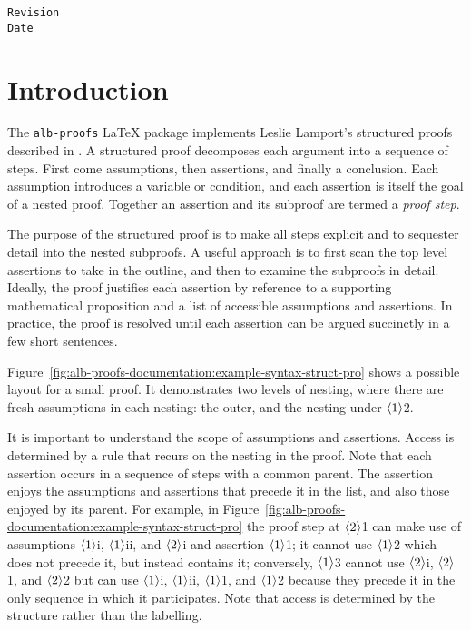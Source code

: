 \documentclass[11pt,a4paper,oneside,titlepage]{alb-corp}
\begin{document}
\begin{albTitlePage}

  \verb$Revision$\\
  \verb$Date$

\end{albTitlePage}




\section{Introduction}
\label{sec:alb-proofs-examples:intr}

The \texttt{alb-proofs} \LaTeX{} package implements Leslie Lamport's
structured proofs described in \citep{lamport93:_how_write_proof}.  A
structured proof decomposes each argument into a sequence of steps.
First come assumptions, then assertions, and finally a conclusion.  Each
assumption introduces a variable or condition, and each assertion is
itself the goal of a nested proof.  Together an assertion and its
subproof are termed a \emph{proof step}.

The purpose of the structured proof is to make all steps explicit and to
sequester detail into the nested subproofs.  A useful approach is to
first scan the top level assertions to take in the outline, and then to
examine the subproofs in detail.  Ideally, the proof justifies each
assertion by reference to a supporting mathematical proposition and a
list of accessible assumptions and assertions.  In practice, the proof
is resolved until each assertion can be argued succinctly in a few short
sentences.

Figure~\ref{fig:alb-proofs-documentation:example-syntax-struct-pro}
shows a possible layout for a small proof.  It demonstrates two levels
of nesting, where there are fresh assumptions in each nesting: the
outer, and the nesting under $\albTuple{1}$2.

It is important to understand the scope of assumptions and assertions.
Access is determined by a rule that recurs on the nesting in the proof.
Note that each assertion occurs in a sequence of steps with a common
parent.  The assertion enjoys the assumptions and assertions that
precede it in the list, and also those enjoyed by its parent.  For
example, in
Figure~\ref{fig:alb-proofs-documentation:example-syntax-struct-pro} the
proof step at $\albTuple{2}$1 can make use of assumptions
$\albTuple{1}$i, $\albTuple{1}$ii, and $\albTuple{2}$i and assertion
$\albTuple{1}$1; it cannot use $\albTuple{1}$2 which does not precede
it, but instead contains it; conversely, $\albTuple{1}$3 cannot use
$\albTuple{2}$i, $\albTuple{2}$1, and $\albTuple{2}$2 but can use
$\albTuple{1}$i, $\albTuple{1}$ii, $\albTuple{1}$1, and $\albTuple{1}$2
because they precede it in the only sequence in which it participates.
Note that access is determined by the structure rather than the
labelling.
\end{document}
